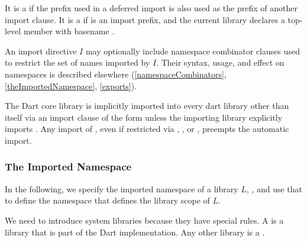\documentclass[makeidx]{article}
\begin{document}
\LMHash{}%
It is a  if the prefix used in a deferred import
is also used as the prefix of another import clause.
It is a  if \id{} is an import prefix,
and the current library declares a top-level member with basename \id.

\LMHash{}%
An import directive $I$ may optionally include namespace combinator clauses
used to restrict the set of names imported by $I$.
Their syntax, usage, and effect on namespaces is described elsewhere
(\ref{namespaceCombinators}, \ref{theImportedNamespace},
\ref{exports}).

\LMHash{}%
The Dart core library 
is implicitly imported into every dart library other than itself
via an import clause of the form
unless the importing library explicitly imports .
Any import of ,
even if restricted via \SHOW, \HIDE, or \AS,
preempts the automatic import.


\subsubsection{The Imported Namespace}

\LMHash{}%
In the following, we specify the imported namespace of a library $L$,
,
and use that to define the namespace that defines the library scope of $L$.

\LMHash{}%
We need to introduce system libraries because they have special rules.
A  is a library that is part of the Dart implementation.
Any other library is a .

\end{document}
